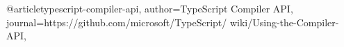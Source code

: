 @article{typescript-compiler-api,
  author={TypeScript Compiler API},
  journal={https://github.com/microsoft/TypeScript/ wiki/Using-the-Compiler-API},
}
